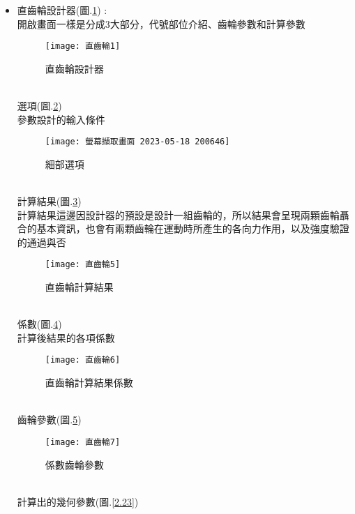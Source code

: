 \begin{itemize}
	\item 直齒輪設計器(圖.\ref{2.18}) :\\
		\qquad 開啟畫面一樣是分成3大部分，代號部位介紹、齒輪參數和計算參數
		\begin{figure}[hbt!]
		\begin{center}
		\texttt{[image: 直齒輪1]}
		\caption{\Large 直齒輪設計器}\label{2.18}
		\end{center}
		\end{figure}
		\\
		選項(圖.\ref{2.19})\\
		參數設計的輸入條件\\
		\begin{figure}[hbt!]
		\begin{center}
		\texttt{[image: 螢幕擷取畫面 2023-05-18 200646]}
		\caption{\Large 細部選項}\label{2.19}
		\end{center}
		\end{figure}
		\\
		計算結果(圖.\ref{2.20})\\
		\qquad 計算結果這邊因設計器的預設是設計一組齒輪的，所以結果會呈現兩顆齒輪聶合的基本資訊，也會有兩顆齒輪在運動時所產生的各向力作用，以及強度驗證的通過與否\\
		\begin{figure}[hbt!]
		\begin{center}
		\texttt{[image: 直齒輪5]}
		\caption{\Large 直齒輪計算結果}\label{2.20}
		\end{center}
		\end{figure}
		\\
		係數(圖.\ref{2.21})\\
		計算後結果的各項係數\\
		\begin{figure}[hbt!]
		\begin{center}
		\texttt{[image: 直齒輪6]}
		\caption{\Large 直齒輪計算結果係數}\label{2.21}
		\end{center}
		\end{figure}
		\\
		齒輪參數(圖.\ref{2.22})\\
		\begin{figure}[hbt!]
		\begin{center}
		\texttt{[image: 直齒輪7]}
		\caption{\Large 係數齒輪參數}\label{2.22}
		\end{center}
		\end{figure}
		\\
		計算出的幾何參數(圖.\ref{2.23})\\

\end{itemize}
